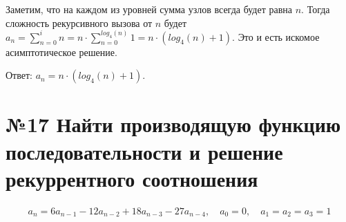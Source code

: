 \documentclass[a4paper,12pt,numbers=noenddot]{scrreprt}
\begin{document}
\begin{flushleft}
Заметим, что на каждом из уровней сумма узлов всегда будет равна $n$. 
Тогда сложность рекурсивного вызова от $n$ будет $a_n=\sum_{n=0}^{i} n = n \cdot \sum_{n=0}^{log_4(n)} 1 = n \cdot (log_4(n)+1)$. Это и есть искомое асимптотическое решение.
\end{flushleft}

\begin{flushleft}
Ответ: $a_n=n \cdot (log_4(n)+1)$.
\end{flushleft}

\section{№17 Найти производящую функцию последовательности и решение рекуррентного соотношения}

\begin{align}
    a_n=6a_{n-1}-12a_{n-2}+18a_{n-3}-27a_{n-4}, \quad a_0=0, \quad a_1=a_2=a_3 = 1
\end{align}
\end{document}
